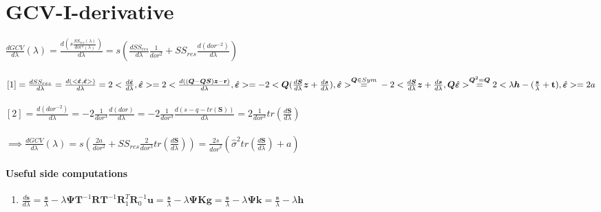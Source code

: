 \documentclass[11pt,twoside]{report}
\begin{document}
\section{GCV-I-derivative}
$ \frac{dGCV}{d\lambda}(\lambda) = \frac{d(s\frac{SS_{res}(\lambda)}{dor^2(\lambda)})}{d\lambda} = s (\frac{dSS_{res}}{d\lambda}\frac{1}{dor^2} + SS_{res}\frac{d(dor^{-2})}{d\lambda}) $\\
\\
$[1] = \frac{dSS_{res}}{d\lambda} = \frac{d(<\hat{\mathbold{\varepsilon}},\hat{\mathbold{\varepsilon}}> )}{d\lambda} = 2<\frac{d\hat{\mathbold{\varepsilon}}}{d\lambda},\hat{\mathbold{\varepsilon}}> = 2 < \frac{d((\mathbold{Q}-\mathbold{Q}\mathbold{S})\mathbold{z}-\mathbf{r})}{d\lambda}, \hat{\mathbold{\varepsilon}}> = -2<\mathbold{Q}(\frac{d\mathbold{S}}{d\lambda}\mathbold{z} + \frac{d\mathbold{s}}{d\lambda}), \hat{\mathbold{\varepsilon}}> \overset{\mathbold{Q}\in Sym}{=}\\ -2<\frac{d\mathbold{S}}{d\lambda}\mathbold{z} + \frac{d\mathbold{s}}{d\lambda},\mathbold{Q} \hat{\mathbold{\varepsilon}}> \overset{\mathbold{Q}^2 = \mathbold{Q}}{=} 2<\lambda \boldsymbol{h} -(\frac{\mathbf{s}}{\lambda} +\mathbf{t}), \hat{\mathbold{\varepsilon}}> = 2a$\\
\\
$[2]= \frac{d(dor^{-2})}{d\lambda} = -2\frac{1}{dor^3}\frac{d(dor)}{d\lambda} = -2\frac{1}{dor^3}\frac{d(s-q-tr(\mathbold{S}))}{d\lambda} = 2\frac{1}{dor^3}tr(\frac{d\mathbold{S}}{d\lambda})$\\
\\
$\implies \frac{dGCV}{d\lambda}(\lambda) = s (\frac{2a}{dor^2} + SS_{res}\frac{2}{dor^3}tr(\frac{d\mathbold{S}}{d\lambda})) = \frac{2s}{{dor}^2}(\hat{\sigma}^2tr(\frac{d\mathbold{S}}{d\lambda}) + a)$

\paragraph{Useful side computations}
\begin{enumerate}
	\item $ \frac{d\mathbold{s}}{d\lambda} = \frac{\mathbf{s}}{\lambda} - \lambda \boldsymbol{\Psi} \textbf{T}^{-1} \textbf{R}\textbf{T}^{-1} \textbf{R}_1^T\textbf{R}_0^{-1}\textbf{u} =\frac{\mathbf{s}}{\lambda} - \lambda \boldsymbol{\Psi} \textbf{K}\mathbf{g} = \frac{\mathbf{s}}{\lambda} - \lambda \boldsymbol{\Psi} \textbf{k} = \frac{\mathbf{s}}{\lambda} - \lambda \boldsymbol{h} $
\end{enumerate}
\end{document}
